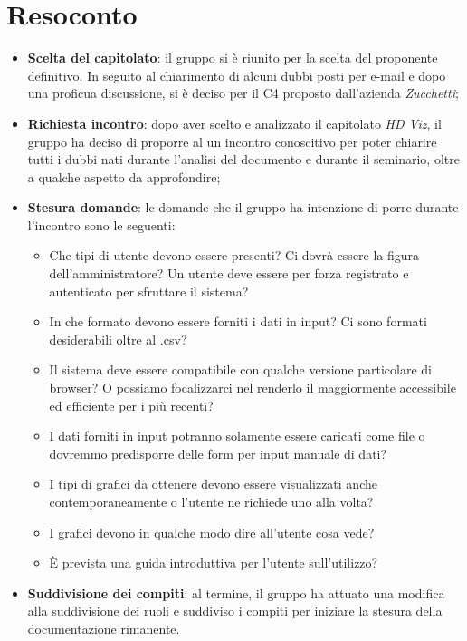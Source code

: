 \section{Resoconto}
\begin{itemize}

\item \textbf{Scelta del capitolato}: il gruppo si è riunito per la scelta del proponente definitivo. In seguito al chiarimento di alcuni dubbi posti per e-mail e dopo una proficua discussione, si è deciso per il  C4 proposto dall'azienda \textit{Zucchetti};

\item \textbf{Richiesta incontro}: dopo aver scelto e analizzato il capitolato \textit{HD Viz}, il gruppo ha deciso di proporre al  un incontro conoscitivo per poter chiarire tutti i dubbi nati durante l'analisi del documento e durante il seminario, oltre a qualche aspetto da approfondire;

\item \textbf{Stesura domande}: le domande che il gruppo ha intenzione di porre durante l'incontro sono le seguenti:
\begin{itemize}
\item Che tipi di utente devono essere presenti? Ci dovrà essere la figura dell'amministratore? Un utente deve essere per forza registrato e autenticato per sfruttare il sistema?
\item In che formato devono essere forniti i dati in input? Ci sono formati desiderabili oltre al .csv?
\item Il sistema deve essere compatibile con qualche versione particolare di browser? O possiamo focalizzarci nel renderlo il maggiormente accessibile ed efficiente per i più recenti?
\item I dati forniti in input potranno solamente essere caricati come file o dovremmo predisporre delle form per input manuale di dati?
\item I tipi di grafici da ottenere devono essere visualizzati anche contemporaneamente o l'utente ne richiede uno alla volta?
\item I grafici devono in qualche modo dire all'utente cosa vede?
\item È prevista una guida introduttiva per l'utente sull'utilizzo?
\end{itemize}

\item \textbf{Suddivisione dei compiti}: al termine, il gruppo ha attuato una modifica alla suddivisione dei ruoli e suddiviso i compiti per iniziare la stesura della documentazione rimanente.

\end{itemize}